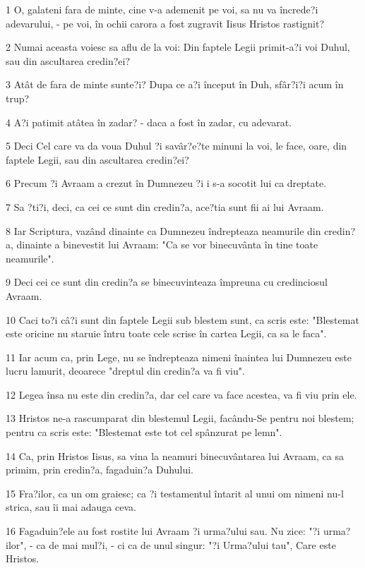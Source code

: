 \par 1 O, galateni fara de minte, cine v-a ademenit pe voi, sa nu va încrede?i adevarului, - pe voi, în ochii carora a fost zugravit Iisus Hristos rastignit?
\par 2 Numai aceasta voiesc sa aflu de la voi: Din faptele Legii primit-a?i voi Duhul, sau din ascultarea credin?ei?
\par 3 Atât de fara de minte sunte?i? Dupa ce a?i început în Duh, sfâr?i?i acum în trup?
\par 4 A?i patimit atâtea în zadar? - daca a fost în zadar, cu adevarat.
\par 5 Deci Cel care va da voua Duhul ?i savâr?e?te minuni la voi, le face, oare, din faptele Legii, sau din ascultarea credin?ei?
\par 6 Precum ?i Avraam a crezut în Dumnezeu ?i i s-a socotit lui ca dreptate.
\par 7 Sa ?ti?i, deci, ca cei ce sunt din credin?a, ace?tia sunt fii ai lui Avraam.
\par 8 Iar Scriptura, vazând dinainte ca Dumnezeu îndrepteaza neamurile din credin?a, dinainte a binevestit lui Avraam: "Ca se vor binecuvânta în tine toate neamurile".
\par 9 Deci cei ce sunt din credin?a se binecuvinteaza împreuna cu credinciosul Avraam.
\par 10 Caci to?i câ?i sunt din faptele Legii sub blestem sunt, ca scris este: "Blestemat este oricine nu staruie întru toate cele scrise în cartea Legii, ca sa le faca".
\par 11 Iar acum ca, prin Lege, nu se îndrepteaza nimeni înaintea lui Dumnezeu este lucru lamurit, deoarece "dreptul din credin?a va fi viu".
\par 12 Legea însa nu este din credin?a, dar cel care va face acestea, va fi viu prin ele.
\par 13 Hristos ne-a rascumparat din blestemul Legii, facându-Se pentru noi blestem; pentru ca scris este: "Blestemat este tot cel spânzurat pe lemn".
\par 14 Ca, prin Hristos Iisus, sa vina la neamuri binecuvântarea lui Avraam, ca sa primim, prin credin?a, fagaduin?a Duhului.
\par 15 Fra?ilor, ca un om graiesc; ca ?i testamentul întarit al unui om nimeni nu-l strica, sau îi mai adauga ceva.
\par 16 Fagaduin?ele au fost rostite lui Avraam ?i urma?ului sau. Nu zice: "?i urma?ilor", - ca de mai mul?i, - ci ca de unul singur: "?i Urma?ului tau", Care este Hristos.
